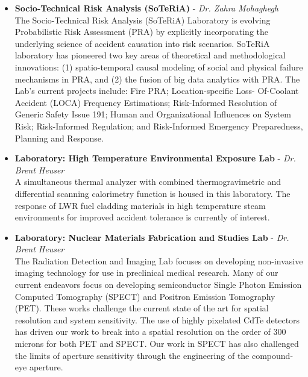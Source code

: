 \documentclass[11pt, letterpaper]{article}
\begin{document}
\begin{itemize}
  \item \textbf{Socio-Technical Risk Analysis (SoTeRiA)} - \textit{Dr. Zahra Mohaghegh}\\
  The Socio-Technical Risk Analysis (SoTeRiA) Laboratory is evolving Probabilistic Risk Assessment (PRA) by explicitly incorporating the underlying science of accident causation into risk scenarios. SoTeRiA laboratory has pioneered two key areas of theoretical and methodological innovations: (1) spatio-temporal causal modeling of social and physical failure mechanisms in PRA, and (2) the fusion of big data analytics with PRA. The Lab’s current projects include: Fire PRA; Location-specific Loss- Of-Coolant Accident (LOCA) Frequency Estimations; Risk-Informed Resolution of Generic Safety Issue 191; Human and Organizational Influences on System Risk; Risk-Informed Regulation; and Risk-Informed Emergency Preparedness, Planning and Response.

  \item \textbf{Laboratory: High Temperature Environmental Exposure Lab} - \textit{Dr. Brent Heuser}\\
  A simultaneous thermal analyzer with combined thermogravimetric and differential scanning calorimetry function is housed in this laboratory. The response of LWR fuel cladding materials in high temperature steam environments for improved accident tolerance is currently of interest.

  \item \textbf{Laboratory: Nuclear Materials Fabrication and Studies Lab} - \textit{Dr. Brent Heuser}\\
  The Radiation Detection and Imaging Lab focuses on developing non-invasive imaging technology for use in preclinical medical research. Many of our current endeavors focus on developing semiconductor Single Photon Emission Computed Tomography (SPECT) and Positron Emission Tomography (PET). These works challenge the current state of the art for spatial resolution and system sensitivity. The use of highly pixelated CdTe detectors has driven our work to break into a spatial resolution on the order of 300 microns for both PET and SPECT. Our work in SPECT has also challenged the limits of aperture sensitivity through the engineering of the compound-eye aperture.
\end{itemize}
\end{document}
